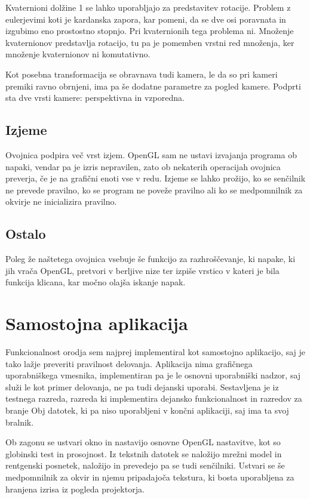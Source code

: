 \documentclass[a4paper, 12pt]{book}
\begin{document}
Kvaternioni dolžine 1 se lahko uporabljajo za predstavitev rotacije. Problem z eulerjevimi koti je kardanska zapora, kar pomeni, da se dve osi poravnata in izgubimo eno prostostno stopnjo. Pri kvaternionih tega problema ni. Množenje kvaternionov predstavlja rotacijo, tu pa je pomemben vrstni red množenja, ker množenje kvaternionov ni komutativno.

Kot posebna transformacija se obravnava tudi kamera, le da so pri kameri premiki ravno obrnjeni, ima pa še dodatne parametre za pogled kamere. Podprti sta dve vrsti kamere: perspektivna in vzporedna.


\subsection{Izjeme}
Ovojnica podpira več vrst izjem. OpenGL sam ne ustavi izvajanja programa ob napaki, vendar pa je izris nepravilen, zato ob nekaterih operacijah ovojnica preverja, če je na grafični enoti vse v redu. Izjeme se lahko prožijo, ko se senčilnik ne prevede pravilno, ko se program ne poveže pravilno ali ko se medpomnilnik za okvirje ne inicializira pravilno.

\subsection{Ostalo}

Poleg že naštetega ovojnica vsebuje še funkcijo za razhroščevanje, ki napake, ki jih vrača OpenGL, pretvori v berljive nize ter izpiše vrstico v kateri je bila funkcija klicana, kar močno olajša iskanje napak.



\section{Samostojna aplikacija}

Funkcionalnost orodja sem najprej implementiral kot samostojno aplikacijo, saj je tako lažje preveriti pravilnost delovanja. Aplikacija nima grafičnega uporabniškega vmesnika, implementiran pa je le osnovni uporabniški nadzor, saj služi le kot primer delovanja, ne pa tudi dejanski uporabi. Sestavljena je iz testnega razreda, razreda ki implementira dejansko funkcionalnost in razredov za branje Obj datotek, ki pa niso uporabljeni v končni aplikaciji, saj ima ta svoj bralnik. 

Ob zagonu se ustvari okno in nastavijo osnovne OpenGL nastavitve, kot so globinski test in prosojnost. Iz tekstnih datotek se naložijo mrežni model in rentgenski posnetek, naložijo in prevedejo pa se tudi senčilniki. Ustvari se še medpomnilnik za okvir in njemu pripadajoča tekstura, ki bosta uporabljena za hranjena izrisa iz pogleda projektorja.
\end{document}
